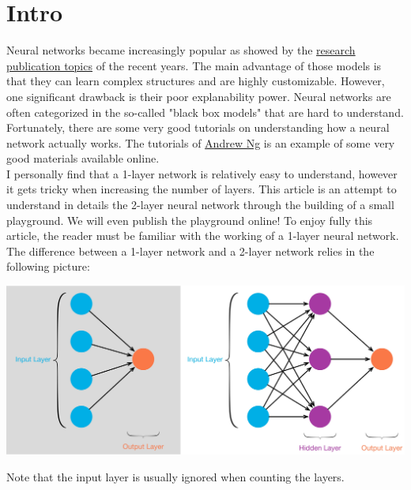 \section{Intro}

Neural networks became increasingly popular as showed by the \href{https://www.kdnuggets.com/2021/05/winning-machine-learning-competition.html}{research publication topics} of the recent years. The main advantage of those models is that they can learn complex structures and are highly customizable. However, one significant drawback is their poor explanability power. Neural networks are often categorized in the so-called "black box models" that are hard to understand.
Fortunately, there are some very good tutorials on understanding how a neural network actually works. The tutorials of \href{https://www.coursera.org/learn/neural-networks-deep-learning}{Andrew Ng} is an example of some very good materials available online. \\

I personally find that a 1-layer network is relatively easy to understand, however it gets tricky when increasing the number of layers. This article is an attempt to understand in details the 2-layer neural network through the building of a small playground. We will even publish the playground online! To enjoy fully this article, the reader must be familiar with the working of a 1-layer neural network.\\

The difference between a 1-layer network and a 2-layer network relies in the following picture: \\

\begin{center}
\includegraphics[scale=0.09]{img/nn-layers.jpeg}
\end{center}

Note that the input layer is usually ignored when counting the layers. \\

